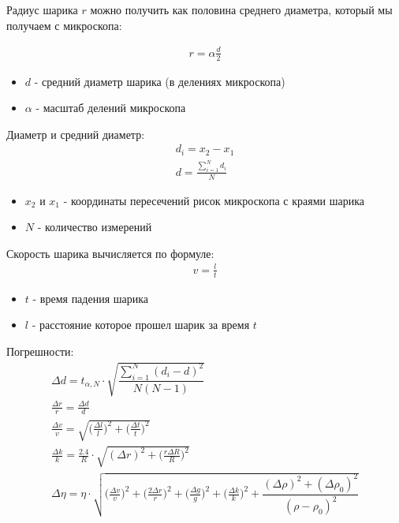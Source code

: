 \documentclass{article}
\begin{document}
Радиус шарика $r$ можно получить как половина среднего диаметра, который мы получаем с микроскопа:

\begin{gather*}
    r = \alpha \frac{ d}{ 2}
\end{gather*}
\begin{itemize}
    \item $d$ - средний диаметр шарика (в делениях микроскопа)
    \item $\alpha$ - масштаб делений микроскопа
\end{itemize}

Диаметр и средний диаметр:
\begin{gather*}
    d_i = x_2 - x_1\\
    d = \frac{ \sum\limits_{ i=1}^{ N}d_i}{ N} 
\end{gather*}
\begin{itemize}
    \item $x_2$ и $x_1$ - координаты пересечений рисок микроскопа с краями шарика
    \item $N$ - количество измерений
\end{itemize}

Скорость шарика вычисляется по формуле:
\begin{gather*}
    v = \frac{ l}{ t}
\end{gather*}
\begin{itemize}
    \item $t$ - время падения шарика
    \item $l$ - расстояние которое прошел шарик за время $t$
\end{itemize}

Погрешности:
\begin{gather*}
    \Delta{d} = t_{ \alpha, N}\cdot\sqrt{\dfrac{\sum\limits_{ i=1}^{ N} (d_i-d)^2}{N(N-1)}}\\
    \frac{ \Delta{r}}{ r} = \frac{ \Delta{d}}{ d} \\
    \frac{ \Delta{v}}{ v} = \sqrt{\bigg( \frac{ \Delta{l}}{ l} \bigg)^2 + \bigg( \frac{ \Delta{t}}{ t} \bigg)^2}\\
    \frac{ \Delta{k}}{ k} = \frac{ 2.4}{ R}\cdot\sqrt{(\Delta r)^2 + \bigg( \frac{ r\Delta{R}}{ R}\bigg)^2}\\
    \Delta \eta = \eta \cdot\sqrt{\bigg( \frac{ \Delta{v}}{ v} \bigg)^2 + 
        \bigg( \frac{ 2\Delta{r}}{ r} \bigg)^2 + \bigg( \frac{ \Delta{g}}{ g} \bigg)^2 +
        \bigg( \frac{ \Delta{k}}{ k} \bigg)^2 + \dfrac{(\Delta \rho)^2 + (\Delta \rho_0)^2}{(\rho - \rho_0)^2}}
\end{gather*}
\end{document}
